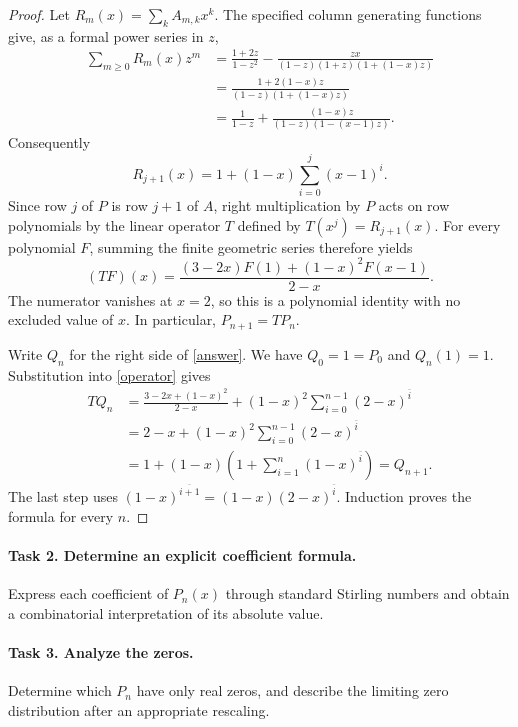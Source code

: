 \documentclass[10pt]{article}
\begin{document}
\begin{proof}
Let \(R_m(x)=\sum_k A_{m,k}x^k\). The specified column generating
functions give, as a formal power series in \(z\),
\begin{align*}
 \sum_{m\ge0}R_m(x)z^m
 &=\frac{1+2z}{1-z^2}
   -\frac{zx}{(1-z)(1+z)(1+(1-x)z)}\\
 &=\frac{1+2(1-x)z}{(1-z)(1+(1-x)z)}\\
 &=\frac1{1-z}+
    \frac{(1-x)z}{(1-z)(1-(x-1)z)}.
\end{align*}
Consequently
\[
 R_{j+1}(x)=1+(1-x)\sum_{i=0}^{j}(x-1)^i.
\]
Since row \(j\) of \(P\) is row \(j+1\) of \(A\), right
multiplication by \(P\) acts on row polynomials by the linear
operator \(T\) defined by \(T(x^j)=R_{j+1}(x)\).
For every polynomial \(F\), summing the finite geometric series
therefore yields
\begin{equation}\label{operator}
 (TF)(x)=\frac{(3-2x)F(1)+(1-x)^2F(x-1)}{2-x}.
\end{equation}
The numerator vanishes at \(x=2\), so this is a polynomial
identity with no excluded value of \(x\). In particular,
\(P_{n+1}=TP_n\).

Write \(Q_n\) for the right side of \eqref{answer}.
We have \(Q_0=1=P_0\) and \(Q_n(1)=1\). Substitution into
\eqref{operator} gives
\begin{align*}
 TQ_n
 &=\frac{3-2x+(1-x)^2}{2-x}
      +(1-x)^2\sum_{i=0}^{n-1}(2-x)^{\overline i}\\
 &=2-x+(1-x)^2\sum_{i=0}^{n-1}(2-x)^{\overline i}\\
 &=1+(1-x)\left(1+
       \sum_{i=1}^{n}(1-x)^{\overline i}\right)=Q_{n+1}.
\end{align*}
The last step uses
\((1-x)^{\overline{i+1}}=(1-x)(2-x)^{\overline i}\).
Induction proves the formula for every \(n\).
\end{proof}

\paragraph{Task 2. Determine an explicit coefficient formula.}
Express each coefficient of \(P_n(x)\) through standard Stirling
numbers and obtain a combinatorial interpretation of its absolute
value.

\paragraph{Task 3. Analyze the zeros.}
Determine which \(P_n\) have only real zeros, and describe the
limiting zero distribution after an appropriate rescaling.
\end{document}
